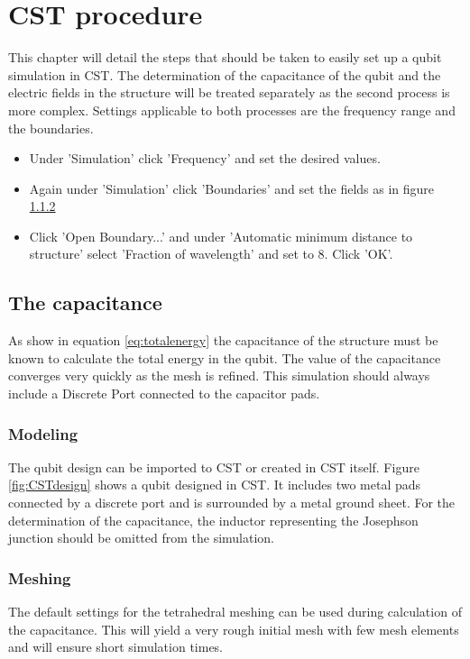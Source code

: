 \chapter{CST procedure}
This chapter will detail the steps that should be taken to easily set up a qubit simulation in CST. The determination of the capacitance of the qubit and the electric fields in the structure will be treated separately as the second process is more complex. Settings applicable to both processes are the frequency range and the boundaries. 
\begin{itemize}
	\item Under 'Simulation' click 'Frequency' and set the desired values.
	\item Again under 'Simulation' click 'Boundaries' and set the fields as in figure \ref{}
	\item Click 'Open Boundary...' and under 'Automatic minimum distance to structure' select 'Fraction of wavelength' and set to 8. Click 'OK'.
\end{itemize}

\section{The capacitance}
As show in equation \eqref{eq:totalenergy} the capacitance of the structure must be known to calculate the total energy in the qubit. The value of the capacitance converges very quickly as the mesh is refined. This simulation should always include a Discrete Port connected to the capacitor pads.
% 
\subsection{Modeling}
The qubit design can be imported to CST or created in CST itself. Figure \ref{fig:CSTdesign} shows a qubit designed in CST. It includes two metal pads connected by a discrete port and is surrounded by a metal ground sheet. 
For the determination of the capacitance, the inductor representing the Josephson junction should be omitted from the simulation.
\subsection{Meshing}
The default settings for the tetrahedral meshing can be used during calculation of the capacitance. This will yield a very rough initial mesh with few mesh elements and will ensure short simulation times.
